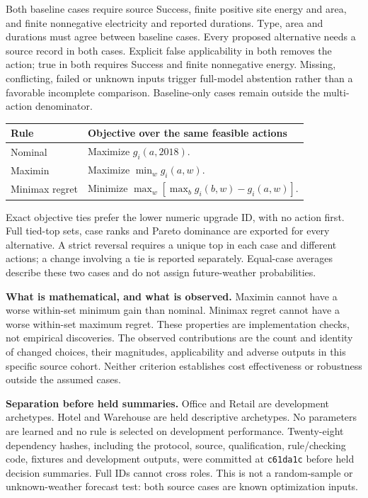 \documentclass[10pt,letterpaper]{article}
\begin{document}
Both baseline cases require source Success, finite positive site energy and area, and finite nonnegative electricity and reported durations. Type, area and durations must agree between baseline cases. Every proposed alternative needs a source record in both cases. Explicit false applicability in both removes the action; true in both requires Success and finite nonnegative energy. Missing, conflicting, failed or unknown inputs trigger full-model abstention rather than a favorable incomplete comparison. Baseline-only cases remain outside the multi-action denominator.

\begin{center}\begin{tabular}{lp{4.7in}}\toprule Rule & Objective over the same feasible actions\\\midrule
Nominal & Maximize $g_i(a,2018)$.\\
Maximin & Maximize $\min_w g_i(a,w)$.\\
Minimax regret & Minimize $\max_w[\max_b g_i(b,w)-g_i(a,w)]$.\\\bottomrule\end{tabular}\end{center}
Exact objective ties prefer the lower numeric upgrade ID, with no action first. Full tied-top sets, case ranks and Pareto dominance are exported for every alternative. A strict reversal requires a unique top in each case and different actions; a change involving a tie is reported separately. Equal-case averages describe these two cases and do not assign future-weather probabilities.

\textbf{What is mathematical, and what is observed.} Maximin cannot have a worse within-set minimum gain than nominal. Minimax regret cannot have a worse within-set maximum regret. These properties are implementation checks, not empirical discoveries. The observed contributions are the count and identity of changed choices, their magnitudes, applicability and adverse outputs in this specific source cohort. Neither criterion establishes cost effectiveness or robustness outside the assumed cases.

\textbf{Separation before held summaries.} Office and Retail are development archetypes. Hotel and Warehouse are held descriptive archetypes. No parameters are learned and no rule is selected on development performance. Twenty-eight dependency hashes, including the protocol, source, qualification, rule/checking code, fixtures and development outputs, were committed at \texttt{c61da1c} before held decision summaries. Full IDs cannot cross roles. This is not a random-sample or unknown-weather forecast test: both source cases are known optimization inputs.
\end{document}
